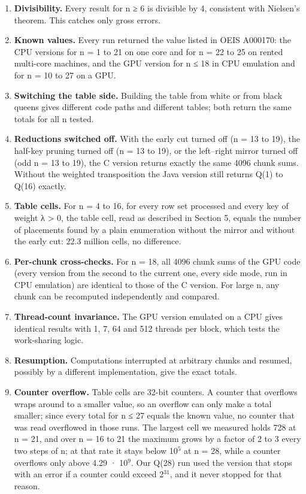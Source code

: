 \begin{enumerate}
\item{} \textbf{Divisibility.} Every result for n ≥ 6 is divisible by 4, consistent with Nielsen's theorem. This catches only gross errors.
\item{} \textbf{Known values.} Every run returned the value listed in OEIS A000170: the CPU versions for n = 1 to 21 on one core and for n = 22 to 25 on rented multi-core machines, and the GPU version for n ≤ 18 in CPU emulation and for n = 10 to 27 on a GPU.
\item{} \textbf{Switching the table side.} Building the table from white or from black queens gives different code paths and different tables; both return the same totals for all n tested.
\item{} \textbf{Reductions switched off.} With the early cut turned off (n = 13 to 19), the half-key pruning turned off (n = 13 to 19), or the left–right mirror turned off (odd n = 13 to 19), the C version returns exactly the same 4096 chunk sums. Without the weighted transposition the Java version still returns Q(1) to Q(16) exactly.
\item{} \textbf{Table cells.} For n = 4 to 16, for every row set processed and every key of weight λ > 0, the table cell, read as described in Section 5, equals the number of placements found by a plain enumeration without the mirror and without the early cut: 22.3 million cells, no difference.
\item{} \textbf{Per-chunk cross-checks.} For n = 18, all 4096 chunk sums of the GPU code (every version from the second to the current one, every side mode, run in CPU emulation) are identical to those of the C version. For large n, any chunk can be recomputed independently and compared.
\item{} \textbf{Thread-count invariance.} The GPU version emulated on a CPU gives identical results with 1, 7, 64 and 512 threads per block, which tests the work-sharing logic.
\item{} \textbf{Resumption.} Computations interrupted at arbitrary chunks and resumed, possibly by a different implementation, give the exact totals.
\item{} \textbf{Counter overflow.} Table cells are 32-bit counters. A counter that overflows wraps around to a smaller value, so an overflow can only make a total smaller; since every total for n ≤ 27 equals the known value, no counter that was read overflowed in those runs. The largest cell we measured holds 728 at n = 21, and over n = 16 to 21 the maximum grows by a factor of 2 to 3 every two steps of n; at that rate it stays below 10$^{5}$ at n = 28, while a counter overflows only above 4.29 · 10$^{9}$. Our Q(28) run used the version that stops with an error if a counter could exceed 2$^{31}$, and it never stopped for that reason.
\end{enumerate}

